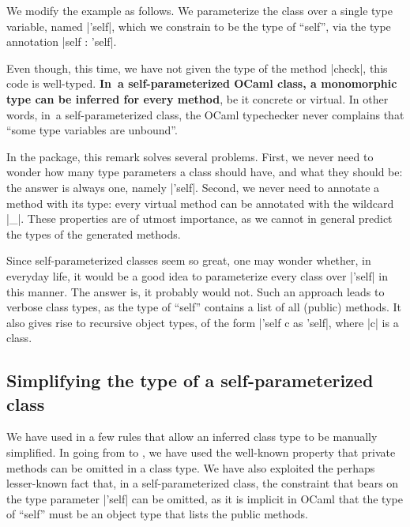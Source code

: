 \documentclass[11pt,a4paper,twoside]{article}
\renewcommand{\emph}[1]{\textbf{#1}}
\begin{document}
%
%

We modify the example as follows. We parameterize the class over a single type
variable, named \oc|'self|, which we constrain to be the type of ``self'', via
the type annotation \oc|self : 'self|.
%

Even though, this time, we have not given the type of the method \oc|check|,
this code is well-typed. \emph{In~a self-parameterized OCaml class, a
  monomorphic type can be inferred for every method}, be it concrete or
virtual. In other words, in~a self-parameterized class, the OCaml typechecker
never complains that ``some type variables are unbound''.

In the \visitors package, this remark solves several problems. First, we never
need to wonder how many type parameters a class should have, and what they
should be: the answer is always one, namely \oc|'self|. Second, we never need
to annotate a method with its type: every virtual method can be annotated with
the wildcard \oc|_|. These properties are of utmost importance, as we cannot
in general predict the types of the generated methods.

Since self-parameterized classes seem so great, one may wonder whether, in
everyday life, it would be a good idea to parameterize every class over
\oc|'self| in this manner. The answer is, it probably would not. Such an
approach leads to verbose class types, as the type of ``self'' contains a list
of all (public) methods. It also gives rise to recursive object types, of the
form \oc|'self c as 'self|, where \oc|c| is a class.


\subsection{Simplifying the type of a self-parameterized class}
\label{sec:oo:monomorphic}

We have used in  a few rules that allow an inferred class
type to be manually simplified. In going from  to
, we have used the well-known property that private
methods can be omitted in a class type. We have also exploited the perhaps
lesser-known fact that, in a self-parameterized class, the constraint that
bears on the type parameter \oc|'self| can be omitted, as it is implicit in
OCaml that the type of ``self'' must be an object type that lists the public
methods.
\end{document}
